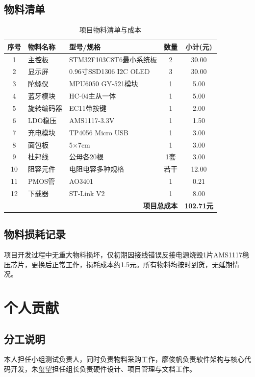 \documentclass[12pt, a4paper]{ctexart}
\begin{document}
\subsection{物料清单}
\begin{table}[htbp]
\centering
\caption{项目物料清单与成本}
\label{tab:bom}
\begin{tabular}{cllcc}
\toprule
序号 & 物料名称 & 型号/规格 & 数量 & 小计(元) \\
\midrule
1 & 主控板 & STM32F103C8T6最小系统板 & 2 & 30.00 \\
2 & 显示屏 & 0.96寸SSD1306 I2C OLED & 3 & 30.00 \\
3 & 陀螺仪 & MPU6050 GY-521模块 & 1 & 5.00 \\
4 & 蓝牙模块 & HC-04主从一体 & 1 & 5.00 \\
5 & 旋转编码器 & EC11带按键 & 1 & 2.00 \\
6 & LDO稳压 & AMS1117-3.3V & 1 & 1.50 \\
7 & 充电模块 & TP4056 Micro USB & 1 & 3.00 \\
8 & 面包板 & 5×7cm & 1 & 3.00 \\
9 & 杜邦线 & 公母各20根 & 1套 & 3.00 \\
10 & 阻容元件 & 电阻电容多种规格 & 若干 & 12.00 \\
11 & PMOS管 & AO3401 & 1 & 0.21 \\
12 & 下载器 & ST-Link V2 & 1 & 8.00 \\
\midrule
\multicolumn{4}{r}{\textbf{项目总成本}} & \textbf{102.71元} \\
\bottomrule
\end{tabular}
\end{table}

\subsection{物料损耗记录}
项目开发过程中无重大物料损坏，仅初期因接线错误反接电源烧毁1片AMS1117稳压芯片，更换后正常工作，损耗成本约1.5元。所有物料均按时到货，无延期情况。

\section{个人贡献}
\subsection{分工说明}
本人担任小组测试负责人，同时负责物料采购工作，廖俊帆负责软件架构与核心代码开发，朱玺望担任组长负责硬件设计、项目管理与文档工作。
\end{document}
